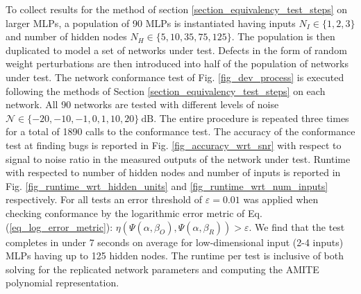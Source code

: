 To collect results for the method of section
\ref{section_equivalency_test_steps} on larger MLPs, a population of 90 MLPs
is instantiated having inputs $N_I \in \{1, 2, 3\}$ and number of hidden nodes
$N_H \in \{5, 10, 35, 75, 125\}$.  The population is then duplicated to
model a set of networks under test.  Defects in the form of random
weight perturbations are then introduced into half of the population
of networks under test. The network conformance test of
Fig. \ref{fig_dev_process} is executed following the methods
of Section \ref{section_equivalency_test_steps} on each network.  All 90
networks are tested with different levels of noise
$\mathcal{N} \in \{-20, -10, -1, 0, 1, 10, 20\}\ \mathrm{dB}$.  The entire procedure is
repeated three times for a total of 1890 calls to the conformance test.
The accuracy of the conformance test at finding bugs is reported in 
Fig. \ref{fig_accuracy_wrt_snr} with respect to signal to noise
ratio in the measured outputs of the network under test.  Runtime with
respected to number of hidden nodes and number of inputs is reported in
Fig. \ref{fig_runtime_wrt_hidden_units} and
\ref{fig_runtime_wrt_num_inputs} respectively.  For all
tests an error threshold of $\varepsilon = 0.01$ was applied
when checking conformance by the logarithmic error metric of
Eq. (\ref{eq_log_error_metric}):
$
\eta(\Psi(\alpha, \beta_O), \Psi(\alpha, \beta_R)) > \varepsilon
$.  We find that the test completes in under 7 seconds on average
for low-dimensional input (2-4 inputs) MLPs having up to 125
hidden nodes.  The runtime per test is inclusive of both solving
for the replicated network parameters and computing the AMITE
polynomial representation.

